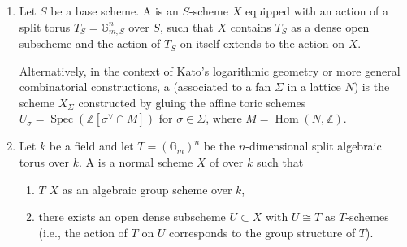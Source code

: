 \begin{definition} \label{definition:toric_variety_over_a_field}
    \begin{enumerate}
        \item Let $S$ be a base scheme. A  is an $S$-scheme $X$ equipped with an action of a split torus $T_S = \mathbb{G}_{m, S}^n$ over $S$, such that $X$ contains $T_S$ as a dense open subscheme and the action of $T_S$ on itself extends to the action on $X$.

        Alternatively, in the context of Kato's logarithmic geometry or more general combinatorial constructions, a  (associated to a fan $\Sigma$ in a lattice $N$) is the scheme $X_\Sigma$ constructed by gluing the affine toric schemes $U_\sigma = \operatorname{Spec}(\mathbb{Z}[\sigma^\vee \cap M])$ for $\sigma \in \Sigma$, where $M = \operatorname{Hom}(N, \mathbb{Z})$.

        \item Let $k$ be a field and let $T = (\mathbb{G}_m)^n$ be the $n$-dimensional split algebraic torus over $k$. A  is a normal   scheme $X$ of  over $k$ such that
        \begin{enumerate}
            \item $T$  $X$ as an algebraic group scheme over $k$,
            \item there exists an open dense subscheme $U \subset X$ with $U \cong T$ as $T$-schemes (i.e., the action of $T$ on $U$ corresponds to the group structure of $T$).
        \end{enumerate}
        \end{enumerate}

\end{definition}